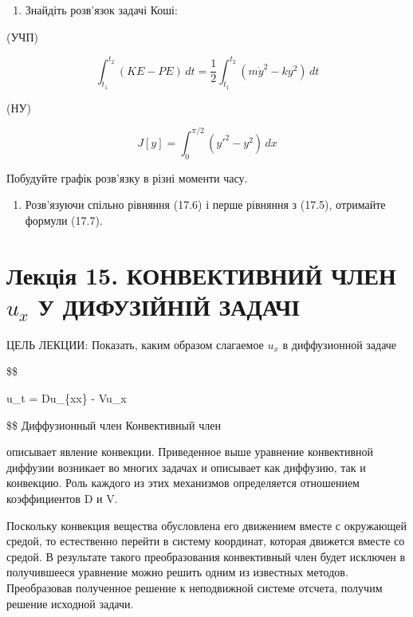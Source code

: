 \documentclass[
  ukrainian,
]{article}
\providecommand{\tightlist}{%
  \setlength{\itemsep}{0pt}\setlength{\parskip}{0pt}}
\begin{document}
\begin{enumerate}
\def\labelenumi{\arabic{enumi}.}
\setcounter{enumi}{3}
\tightlist
\item
  Знайдіть розв'язок задачі Коші:
\end{enumerate}

(УЧП)

\[
\int_{t_{1}}^{t_{2}} (KE - PE)\,dt = \frac{1}{2} \int_{t_{1}}^{t_{2}} (m\dot{y}^{2} - ky^{2})\,dt
\]

(НУ)

\[
J[y] = \int_{0}^{\pi/2} (y'^{2} - y^{2})\,dx
\]

Побудуйте графік розв'язку в різні моменти часу.

\begin{enumerate}
\def\labelenumi{\arabic{enumi}.}
\setcounter{enumi}{4}
\tightlist
\item
  Розв'язуючи спільно рівняння (17.6) і перше рівняння з (17.5),
  отримайте формули (17.7).
\end{enumerate}

\section{\texorpdfstring{Лекція 15. КОНВЕКТИВНИЙ ЧЛЕН \(u_x\) У
ДИФУЗІЙНІЙ
ЗАДАЧІ}{Лекція 15. КОНВЕКТИВНИЙ ЧЛЕН u\_x У ДИФУЗІЙНІЙ ЗАДАЧІ}}\label{ux43bux435ux43aux446ux456ux44f-15.-ux43aux43eux43dux432ux435ux43aux442ux438ux432ux43dux438ux439-ux447ux43bux435ux43d-u_x-ux443-ux434ux438ux444ux443ux437ux456ux439ux43dux456ux439-ux437ux430ux434ux430ux447ux456}

ЦЕЛЬ ЛЕКЦИИ: Показать, каким образом слагаемое \(u_x\) в диффузионной
задаче

\$\$

u\_t = Du\_\{xx\} - Vu\_x

\$\$ Диффузионный член Конвективный член

описывает явление конвекции. Приведенное выше уравнение конвективной
диффузии возникает во многих задачах и описывает как диффузию, так и
конвекцию. Роль каждого из этих механизмов определяется отношением
коэффициентов D и V.

Поскольку конвекция вещества обусловлена его движением вместе с
окружающей средой, то естественно перейти в систему координат, которая
движется вместе со средой. В результате такого преобразования
конвективный член будет исключен в получившееся уравнение можно решить
одним из известных методов. Преобразовав полученное решение к
неподвижной системе отсчета, получим решение исходной задачи.
\end{document}
